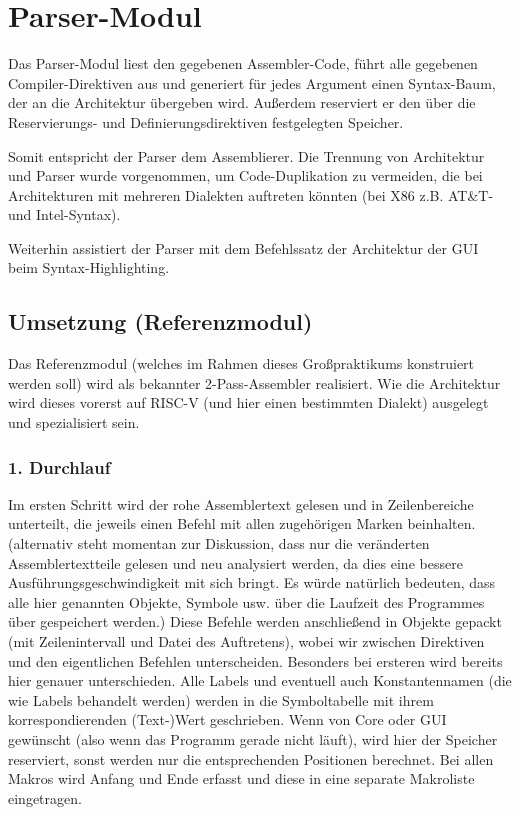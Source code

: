 \chapter{Parser-Modul}



Das Parser-Modul liest den gegebenen Assembler-Code, führt alle gegebenen
Compiler-Direktiven aus und generiert für jedes Argument einen Syntax-Baum, der
an die Architektur übergeben wird.  Außerdem reserviert er den über die
Reservierungs- und Definierungsdirektiven festgelegten Speicher.

Somit entspricht der Parser dem Assemblierer.  Die Trennung von Architektur und
Parser wurde vorgenommen, um Code-Duplikation zu vermeiden, die bei
Architekturen mit mehreren Dialekten auftreten könnten (bei X86 z.B. AT\&T- und
Intel-Syntax).

Weiterhin assistiert der Parser mit dem Befehlssatz der Architektur der GUI beim
Syntax-Highlighting.

\section{Umsetzung (Referenzmodul)}

Das Referenzmodul (welches im Rahmen dieses Großpraktikums konstruiert werden
soll) wird als bekannter 2-Pass-Assembler realisiert. Wie die Architektur wird
dieses vorerst auf RISC-V (und hier einen bestimmten Dialekt) ausgelegt und
spezialisiert sein.

\subsection{1. Durchlauf}

Im ersten Schritt wird der rohe Assemblertext gelesen und in Zeilenbereiche
unterteilt, die jeweils einen Befehl mit allen zugehörigen Marken beinhalten.
(alternativ steht momentan zur Diskussion, dass nur die veränderten
Assemblertextteile gelesen und neu analysiert werden, da dies eine bessere
Ausführungsgeschwindigkeit mit sich bringt.  Es würde natürlich bedeuten, dass
alle hier genannten Objekte, Symbole usw. über die Laufzeit des Programmes über
gespeichert werden.)  Diese Befehle werden anschließend in Objekte gepackt (mit
Zeilenintervall und Datei des Auftretens), wobei wir zwischen Direktiven und den
eigentlichen Befehlen unterscheiden.  Besonders bei ersteren wird bereits hier
genauer unterschieden.  Alle Labels und eventuell auch Konstantennamen (die wie
Labels behandelt werden) werden in die Symboltabelle mit ihrem
korrespondierenden (Text-)Wert geschrieben.  Wenn von Core oder GUI gewünscht
(also wenn das Programm gerade nicht läuft), wird hier der Speicher reserviert,
sonst werden nur die entsprechenden Positionen berechnet.  Bei allen Makros wird
Anfang und Ende erfasst und diese in eine separate Makroliste eingetragen.

